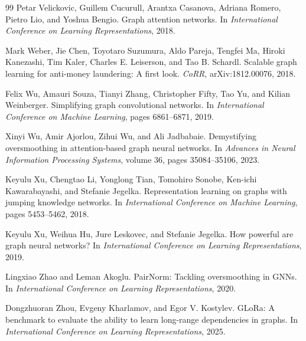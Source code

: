 \begin{thebibliography}{99}
Petar Velickovic, Guillem Cucurull, Arantxa Casanova, Adriana Romero, Pietro Lio, and Yoshua Bengio.
\newblock Graph attention networks.
\newblock In \emph{International Conference on Learning Representations}, 2018.

Mark Weber, Jie Chen, Toyotaro Suzumura, Aldo Pareja, Tengfei Ma, Hiroki Kanezashi, Tim Kaler, Charles E. Leiserson, and Tao B. Schardl.
\newblock Scalable graph learning for anti-money laundering: A first look.
\newblock \emph{CoRR}, arXiv:1812.00076, 2018.

Felix Wu, Amauri Souza, Tianyi Zhang, Christopher Fifty, Tao Yu, and Kilian Weinberger.
\newblock Simplifying graph convolutional networks.
\newblock In \emph{International Conference on Machine Learning}, pages 6861--6871, 2019.

Xinyi Wu, Amir Ajorlou, Zihui Wu, and Ali Jadbabaie.
\newblock Demystifying oversmoothing in attention-based graph neural networks.
\newblock In \emph{Advances in Neural Information Processing Systems}, volume 36, pages 35084--35106, 2023.

Keyulu Xu, Chengtao Li, Yonglong Tian, Tomohiro Sonobe, Ken-ichi Kawarabayashi, and Stefanie Jegelka.
\newblock Representation learning on graphs with jumping knowledge networks.
\newblock In \emph{International Conference on Machine Learning}, pages 5453--5462, 2018.

Keyulu Xu, Weihua Hu, Jure Leskovec, and Stefanie Jegelka.
\newblock How powerful are graph neural networks?
\newblock In \emph{International Conference on Learning Representations}, 2019.

Lingxiao Zhao and Leman Akoglu.
\newblock PairNorm: Tackling oversmoothing in GNNs.
\newblock In \emph{International Conference on Learning Representations}, 2020.

Dongzhuoran Zhou, Evgeny Kharlamov, and Egor V. Kostylev.
\newblock GLoRa: A benchmark to evaluate the ability to learn long-range dependencies in graphs.
\newblock In \emph{International Conference on Learning Representations}, 2025.

\end{thebibliography}
